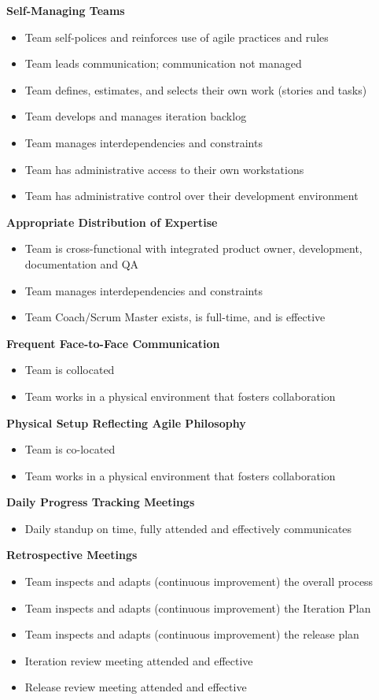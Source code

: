 \textbf{Self-Managing Teams}
\begin{itemize}
	\item Team self-polices and reinforces use of agile practices and rules
	\item Team leads communication; communication not managed
	\item Team defines, estimates, and selects their own work (stories and tasks)
	\item Team develops and manages iteration backlog
	\item Team manages interdependencies and constraints
	\item Team has administrative access to their own workstations 
	\item Team has administrative control over their development environment
\end{itemize}

\textbf{Appropriate Distribution of Expertise}
\begin{itemize}
	\item Team is cross-functional with integrated product owner, development, documentation and QA
	\item Team manages interdependencies and constraints
	\item Team Coach/Scrum Master exists, is full-time, and is effective
\end{itemize}

\textbf{Frequent Face-to-Face Communication}
\begin{itemize}
	\item Team is collocated
	\item Team works in a physical environment that fosters collaboration
\end{itemize}

\textbf{Physical Setup Reflecting Agile Philosophy}
\begin{itemize}
	\item Team is co-located
	\item Team works in a physical environment that fosters collaboration
\end{itemize}

\textbf{Daily Progress Tracking Meetings}
\begin{itemize}
	\item Daily standup on time, fully attended and effectively communicates
\end{itemize}

\textbf{Retrospective Meetings}
\begin{itemize}
	\item Team inspects and adapts (continuous improvement) the overall process
	\item Team inspects and adapts (continuous improvement) the Iteration Plan 
	\item Team inspects and adapts (continuous improvement) the release plan
	\item Iteration review meeting attended and effective
	\item Release review meeting attended and effective
\end{itemize}


